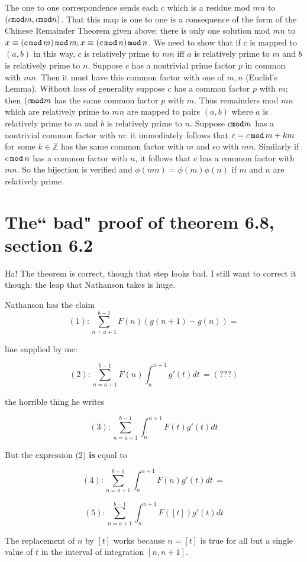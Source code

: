 \documentclass[12pt]{article}
\begin{document}
The one to one correspondence sends each $c$ which is a residue mod $mn$ to $(c {\tt mod}m,c{\tt mod}n)$.  That this map is one to one is a consequence of the form of the Chinese Remainder Theorem given above:  there is only one solution mod $mn$ to $x \equiv (c\,{\tt mod}\,m)\, {\tt mod}\, m; x \equiv (c\,{\tt mod}\, n)\,{\tt mod}\,n$.  We need to show that
if $c$ is mapped to $(a,b)$ in this way, $c$ is relatively prime to $mn$ iff $a$ is relatively prime to $m$ and $b$ is relatively prime to $n$.  Suppose $c$ has a nontrivial prime factor $p$ in common with $mn$.  Then it must have this common factor with one of $m,n$ (Euclid's Lemma).  Without loss of generality suppose $c$ has a common factor $p$ with $m$;  then $(c {\tt mod}m$ has the same common factor $p$ with $m$.  Thus remainders mod $mn$ which are relatively prime to $mn$ are mapped to pairs $(a,b)$ where $a$ is relatively prime to $m$
and $b$ is relatively prime to $n$.  Suppose $c {\tt mod} m$ has a nontrivial common factor with $m$:  it immediately follows that $c = c \,{\tt mod} \,m+km$ for some $k \in \mathbb Z$ has the same common factor with $m$ and so with $mn$.  Similarly if $c \,{\tt mod}\, n$ has a common factor with $n$, it follows that $c$ has a common factor with $mn$.  So the bijection is verified and $\phi(mn) = \phi(m)\phi(n)$ if $m$ and $n$ are relatively prime.

\section{The`` bad" proof of theorem 6.8, section 6.2}

Ha!  The theorem  is correct, though that step looks bad.  I still want to correct it though:  the leap that Nathanson takes is huge.

Nathanson has the claim $$(1):\sum_{n=a+1}^{b-1} F(n)(g(n+1)-g(n)) =$$

line supplied by me:

$$(2):  \sum_{n=a+1}^{b-1} F(n)\int_n^{n+1} g'(t)dt \, =(???)$$

the horrible thing he writes

$$(3):  \sum_{n=a+1}^{b-1} \int_n^{n+1} F(t)g'(t)dt$$

But the expression (2) {\bf is} equal to 

$$(4):  \sum_{n=a+1}^{b-1}\int_n^{n+1} F(n)g'(t)dt \,=$$

$$(5): \sum_{n=a+1}^{b-1}\int_n^{n+1} F([t])g'(t)dt$$

The replacement of $n$ by $[t]$ works because $n=[t]$ is true for all but a single value of $t$ in the interval of integration
$[n,n+1]$.
\end{document}
